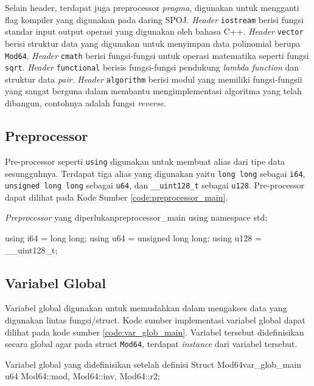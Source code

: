 Selain header, terdapat juga preprocessor \textit{pragma}, digunakan untuk mengganti flag kompiler yang digunakan pada daring SPOJ.
\textit{Header} \texttt{iostream} berisi fungsi standar input output operasi yang digunakan oleh bahasa C++. \textit{Header} \texttt{vector} berisi struktur data yang digunakan untuk menyimpan data polinomial berupa \texttt{Mod64}. \textit{Header} \texttt{cmath} berisi fungsi-fungsi untuk operasi matematika seperti fungsi \texttt{sqrt}. \textit{Header} \texttt{functional} berisis fungsi-fungsi pendukung \textit{lambda function} dan struktur data \textit{pair}. \textit{Header} \texttt{algorithm} berisi modul yang memiliki fungsi-fungsii yang sangat berguna dalam membantu mengimplementasi algoritma yang telah dibangun, contohnya adalah fungsi \textit{reverse}.

\subsection{Preprocessor}
Pre-processor seperti \texttt{using} digunakan untuk membuat alias dari tipe data sesungguhnya. Terdapat tiga alias yang digunakan yaitu \texttt{long long} sebagai \texttt{i64}, \texttt{unsigned long long} sebagai \texttt{u64}, dan \texttt{\_\_uint128\_t} sebagai \texttt{u128}. Pre-processor dapat dilihat pada Kode Sumber \ref{code:preprocessor_main}.

\begin{code}[firstnumber=1]{\textit{Preprocessor} yang diperlukan}{preprocessor_main}
	using namespace std;

	using i64 = long long;
	using u64 = unsigned long long;
	using u128 = __uint128_t;	
\end{code}

\subsection{Variabel Global}
Variabel global digunakan untuk memudahkan dalam mengakses data yang digunakan lintas fungsi/struct. Kode sumber implementasi variabel global dapat dilihat pada kode sumber \ref{code:var_glob_main}. Variabel tersebut didefinisikan secara global agar pada struct \texttt{Mod64}, terdapat \textit{instance} dari variabel tersebut.

\begin{code}[firstnumber=1]{Variabel global yang didefinisikan setelah definisi Struct Mod64}{var_glob_main}
	u64 Mod64::mod, Mod64::inv, Mod64::r2;
\end{code}

